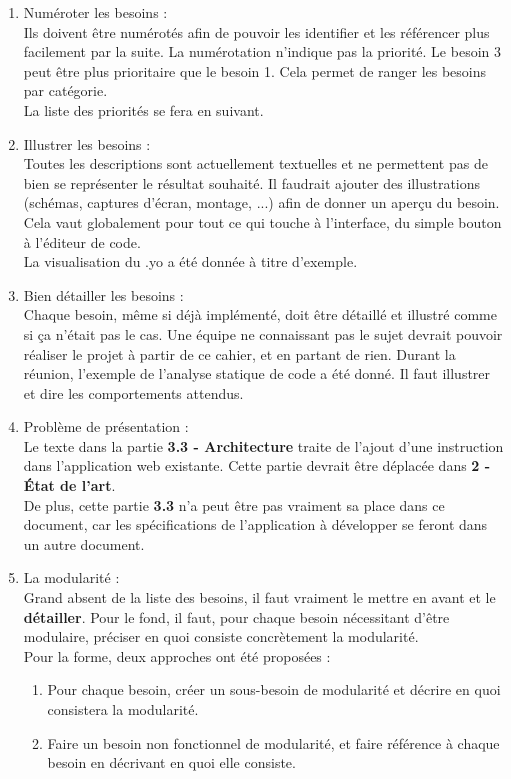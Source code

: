 \documentclass[french]{article}
\begin{document}
\begin{enumerate}
    \item Numéroter les besoins :\\
    Ils doivent être numérotés afin de pouvoir les identifier et les référencer plus facilement par la suite. La numérotation n'indique pas la priorité. Le besoin 3 peut être plus prioritaire que le besoin 1. Cela permet de ranger les besoins par catégorie.\\
    La liste des priorités se fera en suivant. %
    \\
    \item Illustrer les besoins :\\
    Toutes les descriptions sont actuellement textuelles et ne permettent pas de bien se représenter le résultat souhaité. Il faudrait ajouter des illustrations (schémas, captures d'écran, montage, ...) afin de donner un aperçu du besoin. Cela vaut globalement pour tout ce qui touche à l'interface, du simple bouton à l'éditeur de code.\\
    La visualisation du .yo a été donnée à titre d'exemple.
    \\
    \item Bien détailler les besoins :\\
    Chaque besoin, même si déjà implémenté, doit être détaillé et illustré comme si ça n'était pas le cas. Une équipe ne connaissant pas le sujet devrait pouvoir réaliser le projet à partir de ce cahier, et en partant de rien. Durant la réunion, l'exemple de l'analyse statique de code a été donné. Il faut illustrer et dire les comportements attendus.
    \\
    \item Problème de présentation :\\
    Le texte dans la partie \textbf{3.3 - Architecture} traite de l'ajout d'une instruction dans l'application web existante. Cette partie devrait être déplacée dans \textbf{2 - État de l'art}.\\
    De plus, cette partie \textbf{3.3} n'a peut être pas vraiment sa place dans ce document, car les spécifications de l'application à développer se feront dans un autre document.
    \\
    \item La modularité :\\
    Grand absent de la liste des besoins, il faut vraiment le mettre en avant et le \textbf{détailler}. Pour le fond, il faut, pour chaque besoin nécessitant d'être modulaire, préciser en quoi consiste concrètement la modularité.\\
    Pour la forme, deux approches ont été proposées :
    \begin{enumerate}
        \item Pour chaque besoin, créer un sous-besoin de modularité et décrire en quoi consistera la modularité.
        \item Faire un besoin non fonctionnel de modularité, et faire référence à chaque besoin en décrivant en quoi elle consiste. 
        \\
    \end{enumerate}
    

\end{enumerate}
\end{document}
